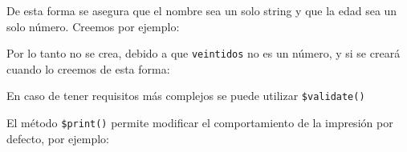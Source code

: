 \documentclass[
]{book}
\newenvironment{Shaded}{\begin{snugshade}}{\end{snugshade}}
\newcommand{\DecValTok}[1]{\textcolor[rgb]{0.00,0.00,0.81}{#1}}
\newcommand{\DocumentationTok}[1]{\textcolor[rgb]{0.56,0.35,0.01}{\textbf{\textit{#1}}}}
\newcommand{\FunctionTok}[1]{\textcolor[rgb]{0.13,0.29,0.53}{\textbf{#1}}}
\newcommand{\NormalTok}[1]{#1}
\newcommand{\OtherTok}[1]{\textcolor[rgb]{0.56,0.35,0.01}{#1}}
\newcommand{\SpecialCharTok}[1]{\textcolor[rgb]{0.81,0.36,0.00}{\textbf{#1}}}
\newcommand{\StringTok}[1]{\textcolor[rgb]{0.31,0.60,0.02}{#1}}
\begin{document}
De esta forma se asegura que el nombre sea un solo string y que la edad sea un solo número. Creemos por ejemplo:

\begin{Shaded}
\end{Shaded}

Por lo tanto no se crea, debido a que \texttt{\textquotesingle{}veintidos\textquotesingle{}} no es un número, y si se creará cuando lo creemos de esta forma:

\begin{Shaded}
\end{Shaded}

En caso de tener requisitos más complejos se puede utilizar \texttt{\$validate()}

El método \texttt{\$print()} permite modificar el comportamiento de la impresión por defecto, por ejemplo:
\end{document}
